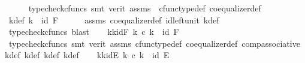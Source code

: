 \begin{isabellebody}
\ \ \ \ \isamarkupfalse%
\ {\isacharparenleft}{\kern0pt}typecheck{\isacharunderscore}{\kern0pt}cfuncs{\isacharcomma}{\kern0pt}\ smt\ {\isacharparenleft}{\kern0pt}verit{\isacharparenright}{\kern0pt}\ assms{\isacharparenleft}{\kern0pt}{}{\isacharparenright}{\kern0pt}\ \ cfunc{\isacharunderscore}{\kern0pt}type{\isacharunderscore}{\kern0pt}def\ coequalizer{\isacharunderscore}{\kern0pt}def{\isacharparenright}{\kern0pt}\isanewline
\isanewline
\ \ \isamarkupfalse%
\ k{\isacharprime}{\kern0pt}{\isacharprime}{\kern0pt}{\isacharunderscore}{\kern0pt}def{}{\isacharcolon}{\kern0pt}\ {\isachardoublequoteopen}k{\isacharprime}{\kern0pt}{\isacharprime}{\kern0pt}\ {\isacharequal}{\kern0pt}\ id\ F{\isachardoublequoteclose}\isanewline
\ \ \ \ \isamarkupfalse%
\ assms{\isacharparenleft}{\kern0pt}{}{\isacharparenright}{\kern0pt}\ coequalizer{\isacharunderscore}{\kern0pt}def\ id{\isacharunderscore}{\kern0pt}left{\isacharunderscore}{\kern0pt}unit{}\ k{\isacharprime}{\kern0pt}{\isacharprime}{\kern0pt}{\isacharunderscore}{\kern0pt}def\ \isamarkupfalse%
\ {\isacharparenleft}{\kern0pt}typecheck{\isacharunderscore}{\kern0pt}cfuncs{\isacharcomma}{\kern0pt}\ blast{\isacharparenright}{\kern0pt}\isanewline
\ \ \isamarkupfalse%
\ kk{\isacharprime}{\kern0pt}{\isacharunderscore}{\kern0pt}idF{\isacharcolon}{\kern0pt}\ {\isachardoublequoteopen}k\ {\isasymcirc}\isactrlsub c\ k{\isacharprime}{\kern0pt}\ {\isacharequal}{\kern0pt}\ id\ F{\isachardoublequoteclose}\isanewline
\ \ \ \ \isamarkupfalse%
\ {\isacharparenleft}{\kern0pt}typecheck{\isacharunderscore}{\kern0pt}cfuncs{\isacharcomma}{\kern0pt}\ smt\ {\isacharparenleft}{\kern0pt}verit{\isacharparenright}{\kern0pt}\ assms{\isacharparenleft}{\kern0pt}{}{\isacharparenright}{\kern0pt}\ cfunc{\isacharunderscore}{\kern0pt}type{\isacharunderscore}{\kern0pt}def\ coequalizer{\isacharunderscore}{\kern0pt}def\ comp{\isacharunderscore}{\kern0pt}associative\ k{\isacharprime}{\kern0pt}{\isacharprime}{\kern0pt}{\isacharunderscore}{\kern0pt}def\ k{\isacharprime}{\kern0pt}{\isacharprime}{\kern0pt}{\isacharunderscore}{\kern0pt}def{}\ k{\isacharprime}{\kern0pt}{\isacharunderscore}{\kern0pt}def\ k{\isacharunderscore}{\kern0pt}def{\isacharparenright}{\kern0pt}\isanewline
\ \ \isamarkupfalse%
\ k{\isacharprime}{\kern0pt}k{\isacharunderscore}{\kern0pt}idE{\isacharcolon}{\kern0pt}\ {\isachardoublequoteopen}k{\isacharprime}{\kern0pt}\ {\isasymcirc}\isactrlsub c\ k\ {\isacharequal}{\kern0pt}\ id\ E{\isachardoublequoteclose}\isanewline

\end{isabellebody}
